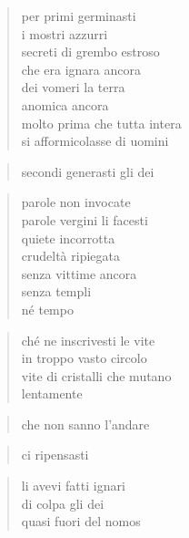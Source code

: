 \clearpage



	\begin{verse}
		per primi germinasti\\
		i mostri azzurri\\
		secreti di grembo estroso\\
		che era ignara ancora\\
		dei vomeri la terra\\
		anomica ancora\\
		molto prima che tutta intera\\
		si afformicolasse di uomini
	\end{verse}


\clearpage



	\begin{verse}
		secondi generasti gli dei
	\end{verse}

	\begin{verse}
		parole non invocate\\
		parole vergini li facesti\\
		quiete incorrotta\\
		crudeltà ripiegata\\
		senza vittime ancora\\
		senza templi\\
		né tempo
	\end{verse}

	\begin{verse}
		ché ne inscrivesti le vite\\
		in troppo vasto circolo\\
		vite di cristalli che mutano\\
		lentamente
	\end{verse}

	\begin{verse}
		che non sanno l’andare
	\end{verse}


\clearpage



	\begin{verse}
		ci ripensasti
	\end{verse}

	\begin{verse}
		li avevi fatti ignari\\
		di colpa gli dei\\
		quasi fuori del nomos
	\end{verse}

